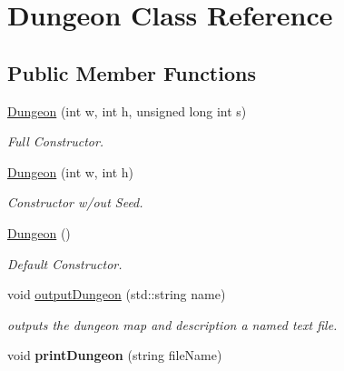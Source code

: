 \hypertarget{classDungeon}{\section{Dungeon Class Reference}
\label{classDungeon}
}
\subsection*{Public Member Functions}
\begin{DoxyCompactItemize}
\item 
\hyperlink{classDungeon_ae6720313325d75566e13a900bc37c193}{Dungeon} (int w, int h, unsigned long int s)
\begin{DoxyCompactList}\small\item\em Full Constructor. \end{DoxyCompactList}\item 
\hyperlink{classDungeon_a063588baadc8a646ecbe7df5e3b548fb}{Dungeon} (int w, int h)
\begin{DoxyCompactList}\small\item\em Constructor w/out Seed. \end{DoxyCompactList}\item 
\hypertarget{classDungeon_a556acaa766b2e25a89f51267c12daa66}{\hyperlink{classDungeon_a556acaa766b2e25a89f51267c12daa66}{Dungeon} ()}\label{classDungeon_a556acaa766b2e25a89f51267c12daa66}

\begin{DoxyCompactList}\small\item\em Default Constructor. \end{DoxyCompactList}\item 
void \hyperlink{classDungeon_af4efb57d78040b4aff7db0a2a6234685}{output\+Dungeon} (std\+::string name)
\begin{DoxyCompactList}\small\item\em outputs the dungeon map and description a named text file. \end{DoxyCompactList}\item 
\hypertarget{classDungeon_a4a71afad3098b60cf8d8ccbeeef7a4d4}{void {\bfseries print\+Dungeon} (string file\+Name)}\label{classDungeon_a4a71afad3098b60cf8d8ccbeeef7a4d4}

\end{DoxyCompactItemize}
